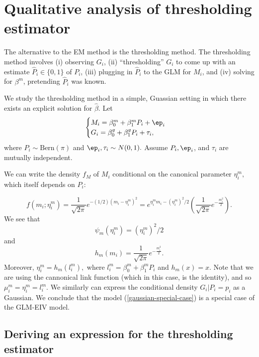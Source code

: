 \documentclass[12pt]{article}
\begin{document}
\section{Qualitative analysis of thresholding estimator}

The alternative to the EM method is the thresholding method. The thresholding method involves (i) observing $G_i$, (ii) ``thresholding'' $G_i$ to come up with an estimate $\hat{P}_i \in \{0,1 \}$ of $P_i$, (iii) plugging in $\hat{P}_i$ to the GLM for $M_i$, and (iv) solving for $\beta^m$, pretending $\hat{P}_i$ was known.

We study the thresholding method in a simple, Guassian setting in which there exists an explicit solution for $\hat{\beta}$. Let 
\begin{equation}\label{gaussian-special-case}
\begin{cases}
M_i = \beta_0^m + \beta_1^m P_i + \ep_i \\
G_i = \beta_0^g + \beta_1^g P_i + \tau_i, \\
\end{cases}
\end{equation} where $P_i \sim \textrm{Bern}(\pi)$ and  $\ep_i, \tau_i \sim N(0,1).$ Assume $P_i, \ep_i$, and $\tau_i$ are mutually independent. 

We can write the density $f_M$ of $M_i$ conditional on the canonical parameter $\eta^m_i,$ which itself depends on $P_i$:

$$ f(m_i; \eta^m_i) = \frac{1}{ \sqrt{2 \pi}} e^{-(1/2) (m_i - \eta^m_i)^2} =  e^{ \eta_i^m m_i - (\eta_i^m)^2/2} \left( \frac{1}{\sqrt{2\pi}} e^{-\frac{ m_i^2 }{2}} \right).$$
\noindent
We see that
$$\psi_m( \eta_i^m) = (\eta_i^m)^2/2$$ and $$ h_m(m_i) = \frac{1}{ \sqrt{2 \pi}} e^{- \frac{m_i^2}{2}}.$$
Moreover, 
$\eta_i^m = h_m(l_i^m),$ where $l_i^m = \beta_0^m + \beta_1^m P_i$ and $h_m(x) = x.$ Note that we are using the cannonical link function (which in this case, is the identity), and so $\mu^m_i = \eta^m_i = l^m_i$. We similarly can express the conditional density $G_i | P_i = p_i$ as a Gaussian. We conclude that the model (\ref{gaussian-special-case}) is a special case of the GLM-EIV model.

\subsection{Deriving an expression for the thresholding estimator}
\end{document}
